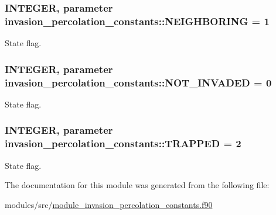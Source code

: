 \hypertarget{classinvasion__percolation__constants_a399688d428fc375c444f249be2ed3d6f}{
\subsubsection[{\-N\-E\-I\-G\-H\-B\-O\-R\-I\-N\-G}]{\setlength{\rightskip}{0pt plus 5cm}\-I\-N\-T\-E\-G\-E\-R, parameter {\bf invasion\-\_\-percolation\-\_\-constants\-::\-N\-E\-I\-G\-H\-B\-O\-R\-I\-N\-G} = 1}}
\label{classinvasion__percolation__constants_a399688d428fc375c444f249be2ed3d6f}


\-State flag. 

\hypertarget{classinvasion__percolation__constants_aed7a90f1cf05ee48aa9ab767d4d758f9}{
\subsubsection[{\-N\-O\-T\-\_\-\-I\-N\-V\-A\-D\-E\-D}]{\setlength{\rightskip}{0pt plus 5cm}\-I\-N\-T\-E\-G\-E\-R, parameter {\bf invasion\-\_\-percolation\-\_\-constants\-::\-N\-O\-T\-\_\-\-I\-N\-V\-A\-D\-E\-D} = 0}}
\label{classinvasion__percolation__constants_aed7a90f1cf05ee48aa9ab767d4d758f9}


\-State flag. 

\hypertarget{classinvasion__percolation__constants_a3f1df7c878ae4de6a5fbd1b34adb6a1d}{
\subsubsection[{\-T\-R\-A\-P\-P\-E\-D}]{\setlength{\rightskip}{0pt plus 5cm}\-I\-N\-T\-E\-G\-E\-R, parameter {\bf invasion\-\_\-percolation\-\_\-constants\-::\-T\-R\-A\-P\-P\-E\-D} = 2}}
\label{classinvasion__percolation__constants_a3f1df7c878ae4de6a5fbd1b34adb6a1d}


\-State flag. 



\-The documentation for this module was generated from the following file\-:\begin{DoxyCompactItemize}
\item 
modules/src/\hyperlink{module__invasion__percolation__constants_8f90}{module\-\_\-invasion\-\_\-percolation\-\_\-constants.\-f90}\end{DoxyCompactItemize}
